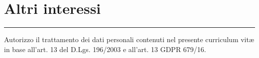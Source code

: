 \documentclass[11pt,a4paper,roman]{moderncv}
\begin{document}
\section{Altri interessi}
\renewcommand{\listitemsymbol}{-~}

\vspace*{\fill}
\rule[1ex]{\textwidth}{0.5pt}
Autorizzo il trattamento dei dati personali contenuti nel presente curriculum vitæ in base all'art. 13 del D.Lgs. 196/2003 e all'art. 13 GDPR 679/16.
\end{document}
